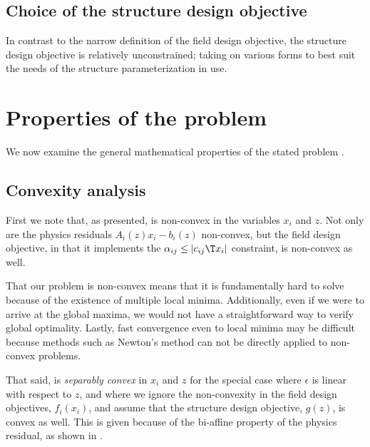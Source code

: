 \documentclass{book}
\begin{document}
\subsection{Choice of the structure design objective}
In contrast to the narrow definition of the field design objective,
    the structure design objective is relatively unconstrained;
    taking on various forms to best suit the needs of
    the structure parameterization in use.

\section{Properties of the problem}
We now examine the general mathematical properties 
    of the stated problem .

\subsection{Convexity analysis}
First we note that, as presented, 
     is non-convex 
    in the variables $x_i$ and $z$. %
Not only are the physics residuals $A_i(z)x_i - b_i(z)$ non-convex,
    but the field design objective, in that it implements the 
    $ \alpha_{ij} \le |c_{ij}\T x_i| $ constraint, is non-convex as well.

That our problem is non-convex means that it is fundamentally hard to solve
    because of the existence of multiple local minima.
Additionally, even if we were to arrive at the global maxima,
    we would not have a straightforward way to verify global optimality.
Lastly, fast convergence even to local minima may be difficult
    because methods such as Newton's method
    can not be directly applied to non-convex problems.

That said,  is \emph{separably convex} 
    in $x_i$ and $z$ for the special case where
    $\epsilon$ is linear with respect to $z$, and
    where we ignore the non-convexity
    in the field design objectives, $f_i(x_i)$, and
    assume that the structure design objective, $g(z)$, is convex as well.
This is given because of the bi-affine property
    of the physics residual, as shown in .
\end{document}

